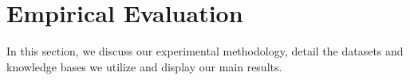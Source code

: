\documentclass[twoside,11pt]{article}
\theoremstyle{definition}
\begin{document}





\section{Empirical Evaluation}
In this section, we discuss our experimental methodology, detail the datasets and knowledge bases we utilize and display our main results.
\end{document}
